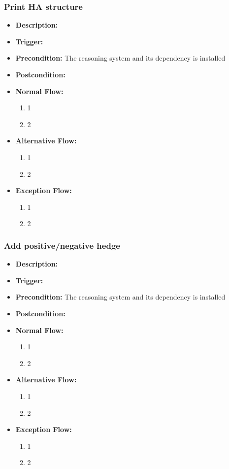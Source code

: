 \documentclass[../gr-final.tex]{subfiles}
\begin{document}
\subsubsection{Print HA structure}
\begin{itemize}
  \item {\bfseries Description:} 
  \item {\bfseries Trigger:}
  \item {\bfseries Precondition:} The reasoning system and its
    dependency is installed
    
  \item {\bfseries Postcondition:}

  \item {\bfseries Normal Flow:}
    \begin{enumerate}
      \item 1
      \item 2
    \end{enumerate}
  \item {\bfseries Alternative Flow:}
    \begin{enumerate}
      \item 1
      \item 2
    \end{enumerate}
  \item {\bfseries Exception Flow:}
    \begin{enumerate}
      \item 1
      \item 2
    \end{enumerate}
\end{itemize}
\subsubsection{Add positive/negative hedge}
\begin{itemize}
  \item {\bfseries Description:} 
  \item {\bfseries Trigger:}
  \item {\bfseries Precondition:} The reasoning system and its
    dependency is installed
    
  \item {\bfseries Postcondition:}

  \item {\bfseries Normal Flow:}
    \begin{enumerate}
      \item 1
      \item 2
    \end{enumerate}
  \item {\bfseries Alternative Flow:}
    \begin{enumerate}
      \item 1
      \item 2
    \end{enumerate}
  \item {\bfseries Exception Flow:}
    \begin{enumerate}
      \item 1
      \item 2
    \end{enumerate}
\end{itemize}
\end{document}
